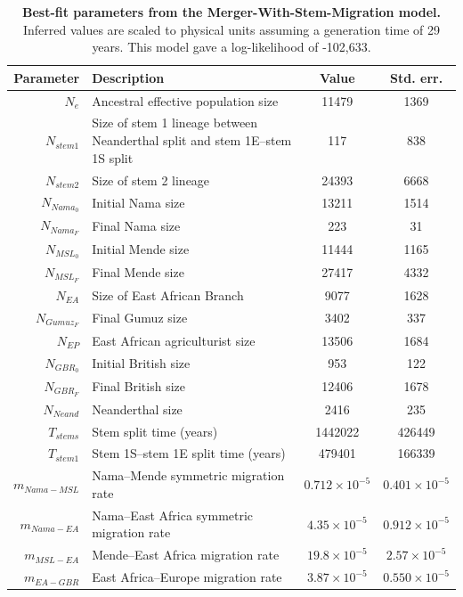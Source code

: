 \documentclass[]{article}
\begin{document}
\begin{table}[ht]
\caption{
    \label{tab:supp-merger-with-stem-migration}
    \textbf{Best-fit parameters from the Merger-With-Stem-Migration model.}
    Inferred values are scaled to physical units assuming a generation time of
    29 years. This model gave a log-likelihood of -102,633.
}
\centering
\begin{tabular}[t]{rP{8cm}cc}
    \toprule
    Parameter & Description & Value & Std. err.\\
    \midrule
    $N_e$ & Ancestral effective population size & 11479 & 1369 \\
    $N_{stem1}$ & Size of stem 1 lineage between Neanderthal split and stem 1E--stem 1S split & 117 & 838 \\
    $N_{stem2}$ & Size of stem 2 lineage & 24393 & 6668 \\
    $N_{Nama_0}$ & Initial Nama size & 13211 & 1514 \\
    $N_{Nama_F}$ & Final Nama size & 223 & 31 \\
    $N_{MSL_0}$ & Initial Mende size & 11444 & 1165 \\
    $N_{MSL_F}$ & Final Mende size & 27417 & 4332 \\
    $N_{EA}$ & Size of East African Branch & 9077 & 1628 \\
    $N_{Gumuz_F}$ & Final Gumuz size & 3402 & 337 \\
    $N_{EP}$ & East African agriculturist size & 13506 & 1684 \\
    $N_{GBR_0}$ & Initial British size & 953 & 122 \\
    $N_{GBR_F}$ & Final British size & 12406 & 1678 \\
    $N_{Neand}$ & Neanderthal size & 2416 & 235 \\
    $T_{stems}$ & Stem split time (years) & 1442022 & 426449 \\
    $T_{stem1}$ & Stem 1S--stem 1E split time (years) & 479401 & 166339 \\
    $m_{Nama-MSL}$ & Nama--Mende symmetric migration rate & $0.712\times10^{-5}$ & $0.401\times10^{-5}$ \\
    $m_{Nama-EA}$ & Nama--East Africa symmetric migration rate & $4.35\times10^{-5}$ & $0.912\times10^{-5}$ \\
    $m_{MSL-EA}$ & Mende--East Africa migration rate & $19.8\times10^{-5}$ & $2.57\times10^{-5}$ \\
    $m_{EA-GBR}$ & East Africa--Europe migration rate & $3.87\times10^{-5}$ & $0.550\times10^{-5}$ \\

\end{tabular}
\end{table}
\end{document}
